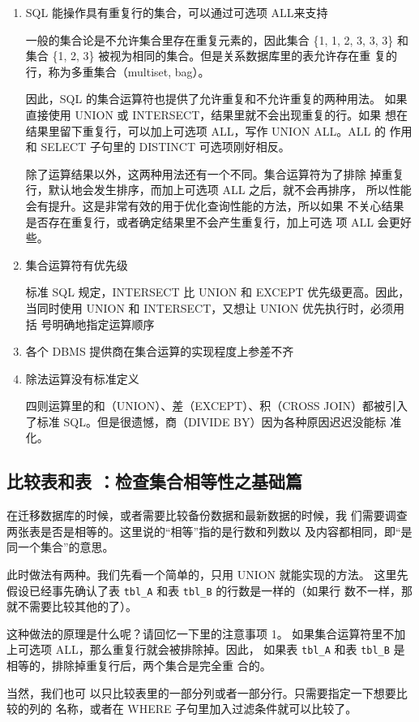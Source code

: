 \cautions

\begin{enumerate}
\item SQL 能操作具有重复行的集合，可以通过可选项 ALL来支持

一般的集合论是不允许集合里存在重复元素的，因此集合 \{1, 1, 2, 3, 3,
3\} 和集合 \{1, 2, 3\} 被视为相同的集合。但是关系数据库里的表允许存在重
复的行，称为多重集合（multiset, bag）。

因此，SQL 的集合运算符也提供了允许重复和不允许重复的两种用法。
如果直接使用 UNION 或 INTERSECT，结果里就不会出现重复的行。如果
想在结果里留下重复行，可以加上可选项 ALL，写作 UNION ALL。ALL 的
作用和 SELECT 子句里的 DISTINCT 可选项刚好相反。

除了运算结果以外，这两种用法还有一个不同。集合运算符为了排除
掉重复行，默认地会发生排序，而加上可选项 ALL 之后，就不会再排序，
所以性能会有提升。这是非常有效的用于优化查询性能的方法，所以如果
不关心结果是否存在重复行，或者确定结果里不会产生重复行，加上可选
项 ALL 会更好些。
\item 集合运算符有优先级

标准 SQL 规定，INTERSECT 比 UNION 和 EXCEPT 优先级更高。因此，
当同时使用 UNION 和 INTERSECT，又想让 UNION 优先执行时，必须用括
号明确地指定运算顺序
\item 各个 DBMS 提供商在集合运算的实现程度上参差不齐
\item 除法运算没有标准定义

四则运算里的和（UNION）、差（EXCEPT）、积（CROSS JOIN）都被引入了标准 SQL。但是很遗憾，商（DIVIDE BY）因为各种原因迟迟没能标
准化。
\end{enumerate}

\subsection{比较表和表 ：检查集合相等性之基础篇}
在迁移数据库的时候，或者需要比较备份数据和最新数据的时候，我
们需要调查两张表是否是相等的。这里说的“相等”指的是行数和列数以
及内容都相同，即“是同一个集合”的意思。

此时做法有两种。我们先看一个简单的，只用 UNION 就能实现的方法。
这里先假设已经事先确认了表 \verb|tbl_A| 和表 \verb|tbl_B| 的行数是一样的（如果行
数不一样，那就不需要比较其他的了）。

这种做法的原理是什么呢？请回忆一下里的注意事项 1。
如果集合运算符里不加上可选项 ALL，那么重复行就会被排除掉。因此，
如果表 \verb|tbl_A| 和表 \verb|tbl_B| 是相等的，排除掉重复行后，两个集合是完全重
合的。

当然，我们也可
以只比较表里的一部分列或者一部分行。只需要指定一下想要比较的列的
名称，或者在 WHERE 子句里加入过滤条件就可以比较了。